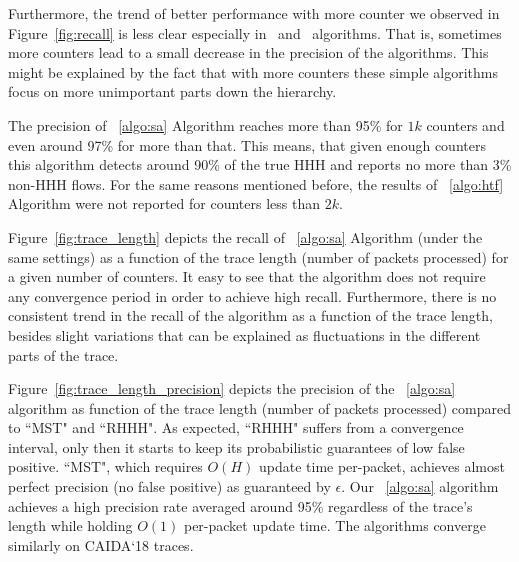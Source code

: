 Furthermore, the trend of better performance with more counter we observed in Figure~\ref{fig:recall} is less clear especially in ~\simpleAlgo and ~\multipleAlgo algorithms. That is, sometimes more counters lead to a small decrease in the precision of the algorithms. This might be explained by the fact that with more counters these simple algorithms focus on more unimportant parts down the hierarchy.

The precision of ~\ref{algo:sa} Algorithm reaches more than 95\% for $1k$ counters and even around 97\% for more than that. This means, that given enough counters this algorithm detects around 90\% of the true HHH and reports no more than 3\% non-HHH flows. For the same reasons mentioned before, the results of ~\ref{algo:htf} Algorithm were not reported for counters less than $2k$.



Figure~\ref{fig:trace_length} depicts the recall of ~\ref{algo:sa} Algorithm (under the same settings) as a function of the trace length (number of packets processed) for a given number of counters. It easy to see that the algorithm does not require any convergence period in order to achieve high recall. Furthermore, there is no consistent trend in the recall of the algorithm as a function of the trace length, besides slight variations that can be explained as fluctuations in the different parts of the trace.



Figure~\ref{fig:trace_length_precision} depicts the precision of the ~\ref{algo:sa} algorithm as function of the trace length (number of packets processed) compared to ``MST" and ``RHHH". As expected, ``RHHH" suffers from a convergence interval, only then it starts to keep its probabilistic guarantees of low false positive. ``MST", which requires $O(H)$ update time per-packet, achieves almost perfect precision (no false positive) as guaranteed by $\epsilon$. Our ~\ref{algo:sa} algorithm achieves a high precision rate averaged around 95\% regardless of the trace's length while holding $O(1)$ per-packet update time. The algorithms converge similarly on CAIDA`18 traces.
